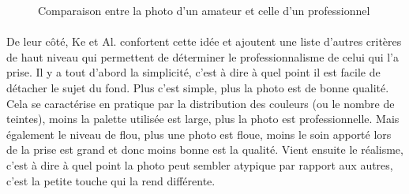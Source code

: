 \documentclass[11pt, french,screen]{report-rd-info}
\begin{document}
\begin{figure}[htp]
 \caption{Comparaison entre la photo d'un amateur et celle d'un professionnel\cite{Ke}}
 \label{fig:ComparaisonPhotosAmateurPro}
\end{figure}
\paragraph*{}
\label{crit:both}
De leur côté, Ke et Al.\cite{Ke} confortent cette idée et ajoutent une liste d’autres critères de haut niveau qui permettent de déterminer le professionnalisme de celui qui l’a prise. Il y a tout d’abord la simplicité, c'est à dire à quel point il est facile de détacher le sujet du fond. Plus c'est simple, plus la photo est de bonne qualité. Cela se caractérise en pratique par la distribution des couleurs (ou le nombre de teintes), moins la palette utilisée est large, plus la photo est professionnelle. Mais également le niveau de flou, plus une photo est floue, moins le soin apporté lors de la prise est grand et donc moins bonne est la qualité.
Vient ensuite le réalisme, c'est à dire à quel point la photo peut sembler atypique par rapport aux autres, c'est la petite touche qui la rend différente.
\end{document}

